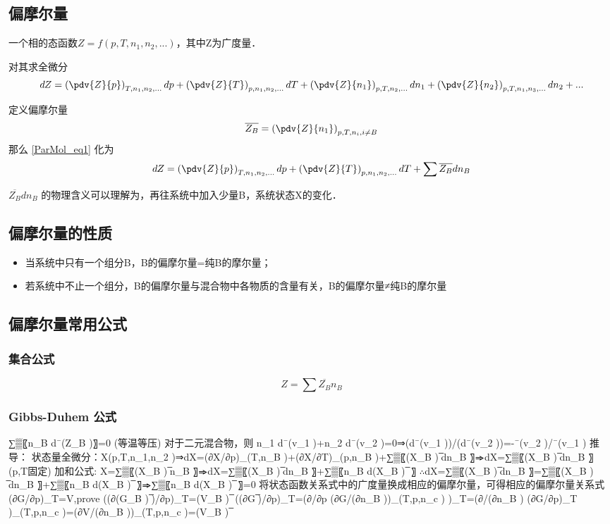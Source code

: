 
\subsection{偏摩尔量}
一个相的态函数$Z=f(p,T,n_1,n_2,...)$，其中Z为广度量．

对其求全微分  
\begin{equation}\label{ParMol_eq1}
dZ = \left(\pdv{Z}{p}\right)_{T,n_1,n_2,...}dp + \left(\pdv{Z}{T}\right)_{p,n_1,n_2,...}dT+\left(\pdv{Z}{n_1}\right)_{p,T,n_2,...}dn_1+\left(\pdv{Z}{n_2}\right)_{p,T,n_1,n_3,...}dn_2+...
\end{equation}

定义偏摩尔量
\begin{equation}
\overline {Z_B} = \left(\pdv{Z}{n_1}\right)_{p,T,n_i, i \neq B} 
\end{equation}
那么 \autoref{ParMol_eq1} 化为 
\begin{equation}
dZ = \left(\pdv{Z}{p}\right)_{T,n_1,n_2,...}dp + \left(\pdv{Z}{T}\right)_{p,n_1,n_2,...}dT+\sum \overline {Z_B} dn_B
\end{equation}

$\overline {Z_B} d n_B$ 的物理含义可以理解为，再往系统中加入少量B，系统状态X的变化．

\subsection{偏摩尔量的性质}
\begin{itemize}
\item 当系统中只有一个组分B，B的偏摩尔量=纯B的摩尔量；
\item 若系统中不止一个组分，B的偏摩尔量与混合物中各物质的含量有关，B的偏摩尔量≠纯B的摩尔量
\end{itemize}

\subsection{偏摩尔量常用公式}
\subsubsection{集合公式}
\begin{equation}
Z=\sum \overline {Z_B}  n_B
\end{equation}
\subsubsection{Gibbs-Duhem 公式}

	∑▒〖n_B d¯(Z_B )〗=0 (等温等压)
	对于二元混合物，则 n_1 d¯(v_1 )+n_2 d¯(v_2 )=0⇒(d¯(v_1 ))/(d¯(v_2 ))=-¯(v_2 )/¯(v_1 )
	推导：
	状态量全微分：X(p,T,n_1,n_2 )⇒dX=(∂X/∂p)_(T,n_B )+(∂X/∂T)_(p,n_B )+∑▒〖(X_B ) ̅dn_B 〗⇒dX=∑▒〖(X_B ) ̅dn_B 〗  (p,T固定)
	加和公式: X=∑▒〖(X_B ) ̅n_B 〗⇒dX=∑▒〖(X_B ) ̅dn_B 〗+∑▒〖n_B d(X_B ) ̅ 〗
	∴dX=∑▒〖(X_B ) ̅dn_B 〗=∑▒〖(X_B ) ̅dn_B 〗+∑▒〖n_B d(X_B ) ̅ 〗⇒∑▒〖n_B d(X_B ) ̅ 〗=0
	将状态函数关系式中的广度量换成相应的偏摩尔量，可得相应的偏摩尔量关系式
	(∂G/∂p)_T=V,prove ((∂(G_B ) ̅)/∂p)_T=(V_B ) ̅
	((∂G ̅)/∂p)_T=(∂/∂p (∂G/(∂n_B ))_(T,p,n_c ) )_T=(∂/(∂n_B ) (∂G/∂p)_T )_(T,p,n_c )=(∂V/(∂n_B ))_(T,p,n_c )=(V_B ) ̅
